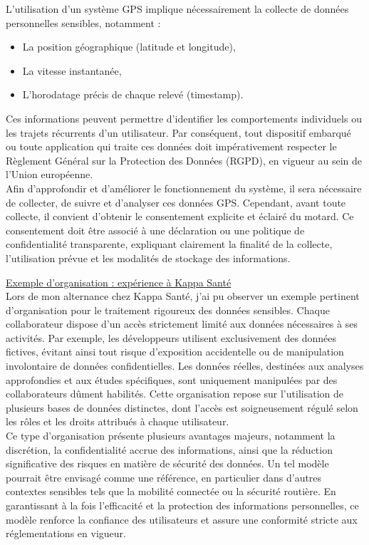L'utilisation d'un système GPS implique nécessairement la collecte de données personnelles sensibles, notamment :
\begin{itemize}
\item La position géographique (latitude et longitude),
\item La vitesse instantanée,
\item L'horodatage précis de chaque relevé (timestamp).
\end{itemize}
Ces informations peuvent permettre d'identifier les comportements individuels ou les trajets récurrents d'un utilisateur. Par conséquent, tout dispositif embarqué ou toute application qui traite ces données doit impérativement respecter le Règlement Général sur la Protection des Données (RGPD), en vigueur au sein de l'Union européenne.\\
Afin d'approfondir et d'améliorer le fonctionnement du système, il sera nécessaire de collecter, de suivre et d'analyser ces données GPS. Cependant, avant toute collecte, il convient d'obtenir le consentement explicite et éclairé du motard. Ce consentement doit être associé à une déclaration ou une politique de confidentialité transparente, expliquant clairement la finalité de la collecte, l'utilisation prévue et les modalités de stockage des informations.

\vspace{0.5cm}
\underline{Exemple d’organisation : expérience à Kappa Santé}\\
Lors de mon alternance chez Kappa Santé, j'ai pu observer un exemple pertinent d'organisation pour le traitement rigoureux des données sensibles. Chaque collaborateur dispose d'un accès strictement limité aux données nécessaires à ses activités. Par exemple, les développeurs utilisent exclusivement des données fictives, évitant ainsi tout risque d'exposition accidentelle ou de manipulation involontaire de données confidentielles.
Les données réelles, destinées aux analyses approfondies et aux études spécifiques, sont uniquement manipulées par des collaborateurs dûment habilités. Cette organisation repose sur l'utilisation de plusieurs bases de données distinctes, dont l'accès est soigneusement régulé selon les rôles et les droits attribués à chaque utilisateur.\\
Ce type d'organisation présente plusieurs avantages majeurs, notamment la discrétion, la confidentialité accrue des informations, ainsi que la réduction significative des risques en matière de sécurité des données. Un tel modèle pourrait être envisagé comme une référence, en particulier dans d'autres contextes sensibles tels que la mobilité connectée ou la sécurité routière. En garantissant à la fois l'efficacité et la protection des informations personnelles, ce modèle renforce la confiance des utilisateurs et assure une conformité stricte aux réglementations en vigueur.\\

